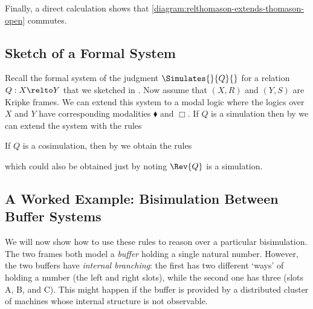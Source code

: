 \documentclass[a4paper,UKenglish,cleveref, autoref]{lipics-v2021}
\begin{document}
Finally, a direct calculation shows that
\eqref{diagram:relthomason-extends-thomason-open} commutes.

\subsection{Sketch of a Formal System}

Recall the formal system of the judgment $\Simulates{}{Q}{}$ for a relation $Q :
X \relto Y$ that we sketched in . Now assume
that \((X, R)\) and \((Y, S)\) are Kripke frames. We can extend this system to a
modal logic where the logics over $X$ and $Y$ have corresponding modalities
$\blacklozenge$ and $\Box$. If $Q$ is a simulation then by
 we can extend the system with the rules
If $Q$ is a cosimulation, then by
 we
obtain the rules
which could also be obtained just by noting $\Rev{Q}$ is a
simulation.

\subsection{A Worked Example: Bisimulation Between Buffer Systems}

We will now show how to use these rules to reason over a particular
bisimulation. The two frames both model a \emph{buffer} holding a single natural
number. However, the two buffers have \emph{internal branching}: the first has
two different `ways' of holding a number (the left and right slots), while the
second one has three (slots A, B, and C). This might happen if the buffer is
provided by a distributed cluster of machines whose internal structure is not
observable.
\end{document}
